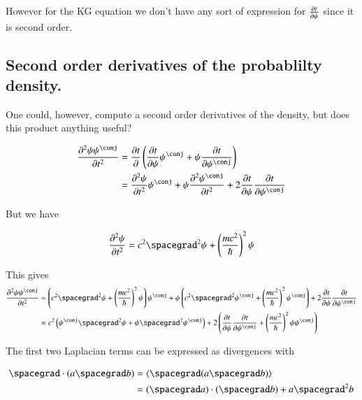 \documentclass{article}
\newcommand{\PDSq}[2]{\frac{\partial^2 {#2}}{\partial {#1}^2}}
\begin{document}
However for the KG equation we don't have any sort of expression for $\frac{\partial{t}}{\partial {\psi}}$ since it is second order.

\subsection{ Second order derivatives of the probablilty density. }

One could, however, compute a second order derivatives of the density, but does this product anything useful?

\begin{align*}
\PDSq{t}{\psi\psi^\conj}
&= \PD{t}{}\left( \PD{t}{\psi}\psi^\conj + \psi \PD{t}{\psi^\conj} \right) \\
&=
\PDSq{t}{\psi}\psi^\conj
+ \psi \PDSq{t}{\psi^\conj}
+ 2 \PD{t}{\psi}\PD{t}{\psi^\conj}
\\
\end{align*}

But we have

\begin{align*}
\PDSq{t}{\psi} = c^2 \spacegrad^2 \psi + \left(\frac{m c^2}{\hbar} \right)^2 \psi
\end{align*}

This gives
\begin{align*}
\PDSq{t}{\psi\psi^\conj}
&=
\left( c^2 \spacegrad^2 \psi + \left(\frac{m c^2}{\hbar} \right)^2 \psi \right) \psi^\conj
+ \psi \left( c^2 \spacegrad^2 \psi^\conj + \left(\frac{m c^2}{\hbar} \right)^2 \psi^\conj \right)
+ 2 \PD{t}{\psi}\PD{t}{\psi^\conj}
\\
&=
c^2 \left( \psi^\conj \spacegrad^2 \psi + \psi \spacegrad^2 \psi^\conj \right)
+ 2 \left(
\PD{t}{\psi}\PD{t}{\psi^\conj} + \left( \frac{m c^2}{\hbar} \right)^2 \psi \psi^\conj
\right)
\\
\end{align*}

The first two Laplacian terms can be expressed as divergences with

\begin{align*}
\spacegrad \cdot (a \spacegrad b)
&=
\gpgradezero{ \spacegrad (a \spacegrad b) } \\
&=
(\spacegrad a) \cdot (\spacegrad b) + a \spacegrad^2 b
\end{align*}
\end{document}
